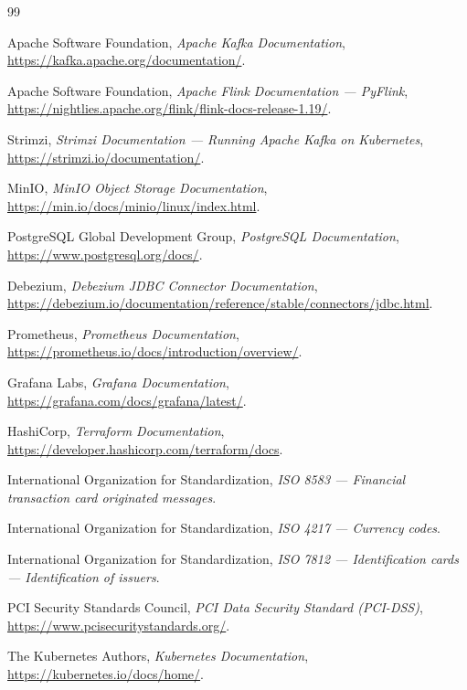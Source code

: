 \begin{thebibliography}{99}

 Apache Software Foundation, \textit{Apache Kafka Documentation},
\url{https://kafka.apache.org/documentation/}.

 Apache Software Foundation, \textit{Apache Flink Documentation ---
PyFlink}, \url{https://nightlies.apache.org/flink/flink-docs-release-1.19/}.

 Strimzi, \textit{Strimzi Documentation --- Running Apache Kafka on
Kubernetes}, \url{https://strimzi.io/documentation/}.

 MinIO, \textit{MinIO Object Storage Documentation},
\url{https://min.io/docs/minio/linux/index.html}.

 PostgreSQL Global Development Group, \textit{PostgreSQL
Documentation}, \url{https://www.postgresql.org/docs/}.

 Debezium, \textit{Debezium JDBC Connector Documentation},
\url{https://debezium.io/documentation/reference/stable/connectors/jdbc.html}.

 Prometheus, \textit{Prometheus Documentation},
\url{https://prometheus.io/docs/introduction/overview/}.

 Grafana Labs, \textit{Grafana Documentation},
\url{https://grafana.com/docs/grafana/latest/}.

 HashiCorp, \textit{Terraform Documentation},
\url{https://developer.hashicorp.com/terraform/docs}.

 International Organization for Standardization, \textit{ISO 8583 ---
Financial transaction card originated messages}.

 International Organization for Standardization, \textit{ISO 4217 ---
Currency codes}.

 International Organization for Standardization, \textit{ISO 7812 ---
Identification cards --- Identification of issuers}.

 PCI Security Standards Council, \textit{PCI Data Security Standard
(PCI-DSS)}, \url{https://www.pcisecuritystandards.org/}.

 The Kubernetes Authors, \textit{Kubernetes Documentation},
\url{https://kubernetes.io/docs/home/}.

\end{thebibliography}
